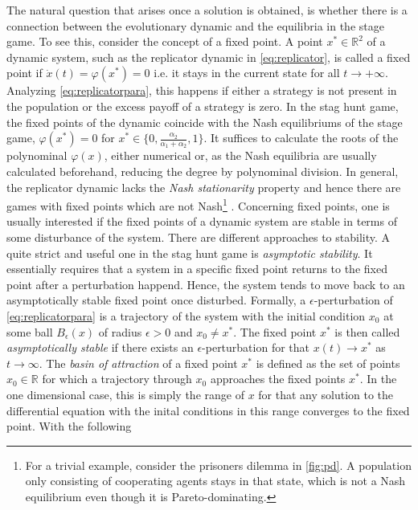 \documentclass[11pt]{article}
\newcommand{\realnumb}{\mathbb{R}}
\begin{document}
The natural question that arises once a solution is obtained, is whether there 
is a connection between the evolutionary dynamic and the equilibria in the 
stage game. To see this, consider the concept of a fixed point.
A point $x^* \in \realnumb^2$ of a dynamic system, such as the replicator 
dynamic in \eqref{eq:replicator}, is called a fixed point
if $\dot{x}(t) = \varphi(x^*) = 0$ i.e. it stays in the current state for all 
$t \rightarrow + \infty $. 
Analyzing \eqref{eq:replicatorpara}, this happens if either a strategy
is not present in the population or the excess payoff of a strategy is zero. 
In the stag hunt game, the fixed points of the
dynamic coincide with the Nash equilibriums of the stage game, 
$\varphi(x^*) = 0$ for $x^* \in \{0,\frac{\alpha_2}{\alpha_1+\alpha_2},1\}$. 
It suffices to calculate the roots of the polynominal $\varphi(x)$, either
numerical or, as the Nash equilibria are usually calculated beforehand,
reducing the degree by polynominal division. In general, the replicator 
dynamic lacks the \textit{Nash stationarity} property and hence there are 
games with fixed points which are not Nash\footnote{For a trivial example, 
consider the prisoners dilemma in \ref{fig:pd}. A population only consisting of 
cooperating agents stays in that state, which is not a Nash equilibrium even 
though it is Pareto-dominating.} \parencite{sandholm_population_2010}.
Concerning fixed points, one is usually interested if the fixed points of 
a dynamic system are stable in terms of some disturbance of the system. 
There are different approaches to stability. A quite strict and useful one 
in the stag hunt game is \textit{asymptotic stability}. 
It essentially requires that a system in a specific fixed point returns 
to the fixed point after a perturbation happend.
Hence, the system tends to move back to an asymptotically stable fixed point
once disturbed. Formally, a $\epsilon$-perturbation of 
\eqref{eq:replicatorpara} is a trajectory of the system with the initial
condition $x_0$ at some ball $B_\epsilon(x)$ of radius $\epsilon >0$ and 
$x_0 \neq x^*$. The fixed point $x^*$ is then called \textit{asymptotically
stable} if there exists an $\epsilon$-perturbation for that $x(t) \rightarrow
x^*$ as $t \rightarrow \infty$. 
The \textit{basin of attraction} of a fixed point $x^*$ is defined as the set 
of points $x_0 \in \realnumb$ for which a trajectory through $x_0$ approaches 
the fixed points $x^*$. In the one dimensional case, this is simply the range 
of $x$ for that any solution to the differential equation with the inital 
conditions in this range converges to the fixed point. With the following 
\end{document}
